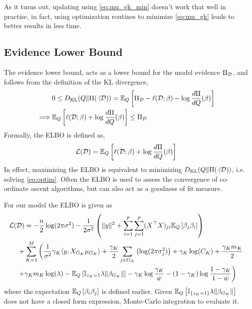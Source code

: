 \documentclass[12pt]{article}
\begin{document}
As it turns out, updating using \eqref{eq:mu_gk_min} doesn't work that well in practise, in fact, using optimization routines to minimize \eqref{eq:mu_gk} leads to better results in less time.

\subsection{Evidence Lower Bound}

The evidence lower bound, acts as a lower bound for the model evidence $\Pi_{\mathcal{D}}$, and follows from the definition of the KL divergence,
\begin{align*}
 & 0 \leq D_\text{KL}(Q \| \Pi(\cdot | \mathcal{D})) = \mathbb{E}_Q \left[ \Pi_{\mathcal{D}} - \ell(\mathcal{D}; \beta) - \log \frac{d\Pi}{dQ} (\beta) \right] \\
    \implies & \mathbb{E}_Q \left[ \ell(\mathcal{D}; \beta) + \log \frac{d\Pi}{dQ} (\beta) \right] \leq \Pi_{\mathcal{D}}
\end{align*}
Formally, the ELBO is defined as,
\begin{equation}
   \mathcal{L}(\mathcal{D}) = \mathbb{E}_Q \left[ \ell(\mathcal{D}; \beta) + \log \frac{d\Pi}{dQ}(\beta) \right]
\end{equation}
In effect, maximizing the ELBO is equivalent to minimizing $D_\text{KL}(Q \| \Pi(\cdot | \mathcal{D})) $, i.e. solving \eqref{eq:optim}. Often the ELBO is used to assess the convergence of co-ordinate ascent algorithms, but can also act as a goodness of fit measure.

For our model the ELBO is given as
\begin{equation} \label{eq:elbo} 
\begin{aligned}
    \mathcal{L}(\mathcal{D}) &= 
- 
    \frac{n}{2} \log(2 \pi \sigma^2) 
- 
    \frac{1}{2\sigma^2} \left( \| y \|^2  + \sum_{i=1}^p \sum_{j=1}^p (X^\top X)_{ji} \mathbb{E}_Q \left[ \beta_j \beta_i \right] \right)\\
+& 
    \sum_{K=1}^M \bigg(  
\frac{1}{\sigma^2} \gamma_K \langle y, X_{G_K} \mu_{G_K} \rangle
+
    \frac{\gamma_K}{2} \sum_{j \in G_K} \left( \log( 2 \pi \sigma_j^2) \right)
+
    \gamma_K \log(C_K)
+ 
    \frac{\gamma_K m_K}{2} \\
+ &
    \gamma_K m_K \log (\lambda)
-
    \mathbb{E}_Q \left[ \mathbb{I}_{z_K =1} \lambda \| \beta_{G_K} \| \right]
-
    \gamma_K \log \frac{\gamma_K}{\bar{w}}
-
    (1-\gamma_K) \log \frac{1 - \gamma_K}{1 - \bar{w}}
\bigg)
\end{aligned}
\end{equation}
where the expectation $\mathbb{E}_Q \left[ \beta_i \beta_j \right]$ is defined earlier. Given $\mathbb{E}_Q \left[ \mathbb{I}_{\{z_K = 1\}} \lambda \| \beta_{G_K} \| \right] $ does not have a closed form expression, Monte-Carlo integration to evaluate it.


\newpage


\appendix
\end{document}
